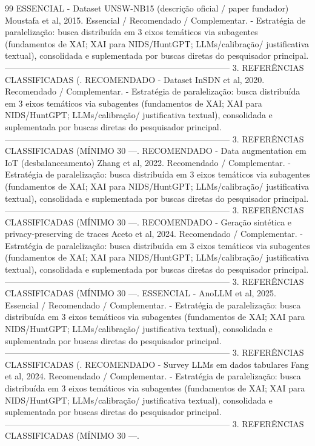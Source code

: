 \documentclass[12pt,a4paper]{article}
\begin{document}
\begin{thebibliography}{99}
 ESSENCIAL - Dataset UNSW-NB15 (descrição oficial / paper fundador) Moustafa et al, 2015. Essencial / Recomendado / Complementar. - Estratégia de paralelização: busca distribuída em 3 eixos temáticos via subagentes (fundamentos de XAI; XAI para NIDS/HuntGPT; LLMs/calibração/ justificativa textual), consolidada e suplementada por buscas diretas do pesquisador principal. -------------------------------------------------------------------------------- 3. REFERÊNCIAS CLASSIFICADAS (.
 RECOMENDADO - Dataset InSDN et al, 2020. Recomendado / Complementar. - Estratégia de paralelização: busca distribuída em 3 eixos temáticos via subagentes (fundamentos de XAI; XAI para NIDS/HuntGPT; LLMs/calibração/ justificativa textual), consolidada e suplementada por buscas diretas do pesquisador principal. -------------------------------------------------------------------------------- 3. REFERÊNCIAS CLASSIFICADAS (MÍNIMO 30 —.
 RECOMENDADO - Data augmentation em IoT (desbalanceamento) Zhang et al, 2022. Recomendado / Complementar. - Estratégia de paralelização: busca distribuída em 3 eixos temáticos via subagentes (fundamentos de XAI; XAI para NIDS/HuntGPT; LLMs/calibração/ justificativa textual), consolidada e suplementada por buscas diretas do pesquisador principal. -------------------------------------------------------------------------------- 3. REFERÊNCIAS CLASSIFICADAS (MÍNIMO 30 —.
 RECOMENDADO - Geração sintética e privacy-preserving de traces Aceto et al, 2024. Recomendado / Complementar. - Estratégia de paralelização: busca distribuída em 3 eixos temáticos via subagentes (fundamentos de XAI; XAI para NIDS/HuntGPT; LLMs/calibração/ justificativa textual), consolidada e suplementada por buscas diretas do pesquisador principal. -------------------------------------------------------------------------------- 3. REFERÊNCIAS CLASSIFICADAS (MÍNIMO 30 —.
 ESSENCIAL - AnoLLM et al, 2025. Essencial / Recomendado / Complementar. - Estratégia de paralelização: busca distribuída em 3 eixos temáticos via subagentes (fundamentos de XAI; XAI para NIDS/HuntGPT; LLMs/calibração/ justificativa textual), consolidada e suplementada por buscas diretas do pesquisador principal. -------------------------------------------------------------------------------- 3. REFERÊNCIAS CLASSIFICADAS (.
 RECOMENDADO - Survey LLMs em dados tabulares Fang et al, 2024. Recomendado / Complementar. - Estratégia de paralelização: busca distribuída em 3 eixos temáticos via subagentes (fundamentos de XAI; XAI para NIDS/HuntGPT; LLMs/calibração/ justificativa textual), consolidada e suplementada por buscas diretas do pesquisador principal. -------------------------------------------------------------------------------- 3. REFERÊNCIAS CLASSIFICADAS (MÍNIMO 30 —.

\end{thebibliography}
\end{document}
